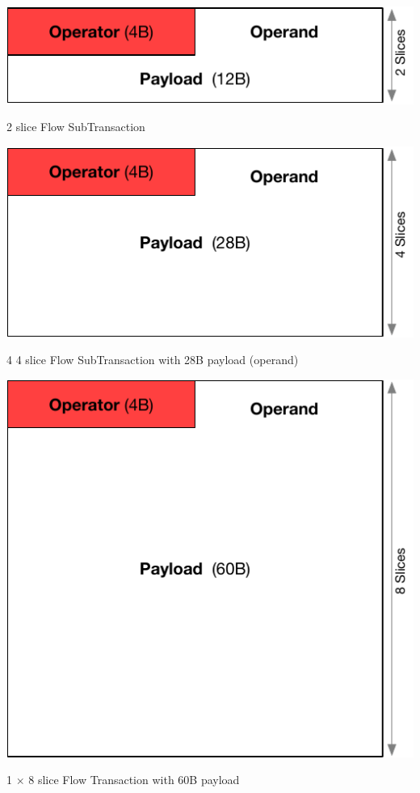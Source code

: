 \documentclass[../OAE-SPEC-MAIN.tex]{subfiles}
\begin{document}
\begin{marginfigure}[-20mm]
    \includegraphics[width=\linewidth]{./figures/2-slice-operator.pdf}
  \caption{2 slice  Flow SubTransaction}%
\end{marginfigure}

\begin{marginfigure}
      \includegraphics[width=\linewidth]{./figures/4-slice-operator.pdf}
  \caption{4 4 slice Flow SubTransaction with 28B payload (operand) \vspace{15pt}} %
\end{marginfigure}

\begin{marginfigure}
        \includegraphics[width=\linewidth]{./figures/8-slice-operator.pdf}
  \caption{1 $\times$ 8 slice Flow  Transaction with 60B payload}
\end{marginfigure}
\end{document}

